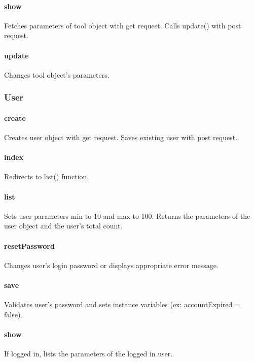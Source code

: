 \documentclass[12pt]{article}
\begin{document}
\paragraph{show} Fetches parameters of tool object with get request. Calls update() with post request.
\paragraph{update} Changes tool object's parameters.

\subsubsection{User}\label{sec:CUser}
\paragraph{create} Creates user object with get request. Saves existing user with post request.
\paragraph{index} Redirects to list() function.
\paragraph{list} Sets user parameters min to 10 and max to 100. Returns the parameters of the user object and the user's total count.
\paragraph{resetPassword} Changes user's login password or displays appropriate error message.
\paragraph{save} Validates user's password and sets instance variables (ex: accountExpired = false).
\paragraph{show} If logged in, lists the parameters of the logged in user.
\end{document}
